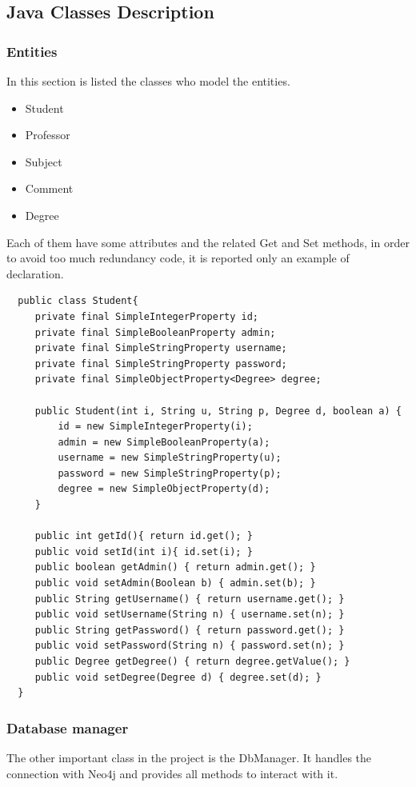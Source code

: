 \documentclass[a4paper]{article}
\begin{document}
\subsection{Java Classes Description}
\subsubsection{Entities}
In this section is listed the classes who model the entities.
\begin{itemize}
\item Student
\item Professor
\item Subject
\item Comment
\item Degree
\end{itemize}
Each of them have some attributes and the related Get and Set methods, in order to avoid too much redundancy code, it is reported only an example of declaration.

\begin{verbatim}
  public class Student{
     private final SimpleIntegerProperty id;
     private final SimpleBooleanProperty admin;
     private final SimpleStringProperty username;
     private final SimpleStringProperty password;
     private final SimpleObjectProperty<Degree> degree;
    
     public Student(int i, String u, String p, Degree d, boolean a) {
         id = new SimpleIntegerProperty(i);
         admin = new SimpleBooleanProperty(a);
         username = new SimpleStringProperty(u);
         password = new SimpleStringProperty(p);
         degree = new SimpleObjectProperty(d);		
     }
    
     public int getId(){ return id.get(); }
     public void setId(int i){ id.set(i); }
     public boolean getAdmin() { return admin.get(); }
     public void setAdmin(Boolean b) { admin.set(b); }
     public String getUsername() { return username.get(); }
     public void setUsername(String n) { username.set(n); }
     public String getPassword() { return password.get(); }
     public void setPassword(String n) { password.set(n); }
     public Degree getDegree() { return degree.getValue(); }
     public void setDegree(Degree d) { degree.set(d); }
  }
\end{verbatim}

\subsubsection{Database manager}
The other important class in the project is the DbManager. It handles the connection with Neo4j and provides all methods to interact with it.
\end{document}
